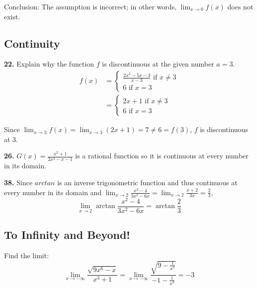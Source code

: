 \documentclass[a4paper,12pt]{article}
\begin{document}
Conclusion: The assumption is incorrect; in other words, $\lim_{x \to 0}f(x)$
does not exist.

\subsection{Continuity}
\textbf{22. }Explain why the function $f$ is discontinuous at the given number
$a = 3$.
\begin{align*}
f(x) &= \begin{cases}
          \frac{2x^2 - 5x - 3}{x - 3}\text{ if } x \neq 3 \\
          6\text{ if } x = 3
        \end{cases}\\
     &= \begin{cases}
          2x + 1\text{ if } x \neq 3 \\
          6\text{ if } x = 3
        \end{cases}
\end{align*}

Since $\lim_{x \to 3}f(x) = \lim_{x \to 3}(2x + 1) = 7 \neq 6 = f(3)$,
$f$ is discontinuous at $3$.


\noindent\textbf{26. }$G(x) = \frac{x^2 + 1}{2x^2 - x - 1}$ is a rational
function so it is continuous at every number in its domain.

\noindent\textbf{38. }Since $arctan$ is an inverse trigonometric function and
thus continuous at every number in its domain and
$\lim_{x \to 2}\frac{x^2 - 4}{3x^2 - 6x} = \lim_{x \to 2}\frac{x + 2}{3x} =
\frac{2}{3}$, \[\lim_{x \to 2}\arctan\frac{x^2 - 4}{3x^2 - 6x} =
\arctan\frac{2}{3}\]

\subsection{To Infinity and Beyond!}
Find the limit:
\[\lim_{x \to -\infty}\frac{\sqrt{9x^6 - x}}{x^3 + 1}
= \lim_{x \to -\infty}\frac{\sqrt{9 - \frac{1}{x^5}}}{-1 - \frac{1}{x^3}}
= -3 \tag{24}\]
\end{document}
